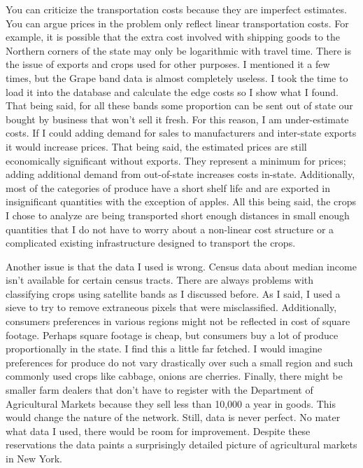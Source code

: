 \documentclass{report}
\begin{document}
You can criticize the transportation costs because they are imperfect estimates. You can argue prices in the problem only reflect linear transportation costs. For example, it is possible that the extra cost involved with shipping goods to the Northern corners of the state may only be logarithmic with travel time. There is the issue of exports and crops used for other purposes. I mentioned it a few times, but the Grape band data is almost completely useless. I took the time to load it into the database and calculate the edge costs so I show what I found. That being said, for all these bands some proportion can be sent out of state our bought by business that won't sell it fresh. For this reason, I am under-estimate costs. If I could adding demand for sales to manufacturers and inter-state exports it would increase prices. That being said, the estimated prices are still economically significant without exports. They represent a minimum for prices; adding additional demand from out-of-state increases costs in-state. Additionally, most of the categories of produce have a short shelf life and are exported in insignificant quantities with the exception of apples. All this being said, the crops I chose to analyze are being transported short enough distances in small enough quantities that I do not have to worry about a non-linear cost structure or a complicated existing infrastructure designed to transport the crops.

Another issue is that the data I used is wrong. Census data about median income isn't available for certain census tracts. There are always problems with classifying crops using satellite bands as I discussed before. As I said, I used a sieve to try to remove extraneous pixels that were misclassified. Additionally, consumers preferences in various regions might not be reflected in cost of square footage. Perhaps square footage is cheap, but consumers buy a lot of produce proportionally in the state. I find this a little far fetched. I would imagine preferences for produce do not vary drastically over such a small region and such commonly used crops like cabbage, onions are cherries. Finally, there might be smaller farm dealers that don't have to register with the Department of Agricultural Markets because they sell less than 10,000 a year in goods. This would change the nature of the network. Still, data is never perfect. No mater what data I used, there would be room for improvement. Despite these reservations the data paints a surprisingly detailed picture of agricultural markets in New York. 
\end{document}
